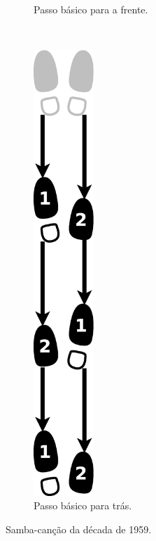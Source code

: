 \begin{itemize}
\begin{figure}[h]
\begin{subfigure}[b]{0.4\textwidth}
        \caption{Passo básico para a frente.}
        \label{fig:samba-cancao-basico-frente}
    \end{subfigure}
    ~ %
    \begin{subfigure}[b]{0.4\textwidth}
        \centering
	\includegraphics[width=0.25\textwidth]{chapters/cap-historia-sambagafieira/samba-cancao-basico-tras.eps}
        \caption{Passo básico para trás.}
        \label{fig:samba-cancao-basico-tras}
    \end{subfigure}
    \caption{Samba-canção da década de 1959.}\label{fig:samba-cancao-basico}
\end{figure}



\end{itemize}
